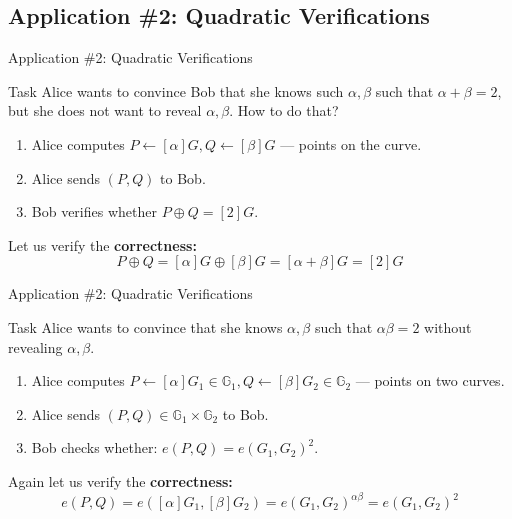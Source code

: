 \documentclass[xcolor={usenames,dvipsnames}]{beamer}
\begin{document}
    \subsection{Application \#2: Quadratic Verifications}
    \begin{frame}{Application \#2: Quadratic Verifications}
        \begin{block}{Task}
            Alice wants to convince Bob that she knows such $\alpha,\beta$ such that $\alpha + \beta = 2$, but she does not want to reveal $\alpha,\beta$. How to do that?
        \end{block}

        \pause\begin{example}
            \begin{enumerate}
                \item Alice computes $P \gets [\alpha]G, Q \gets [\beta]G$ --- points on the curve.
                \item \pause Alice sends $(P,Q)$ to Bob.
                \item \pause Bob verifies whether $P\oplus Q = [2]G$.
            \end{enumerate}
            
            \pause Let us verify the \textbf{correctness:} 
            \begin{equation*}
                P\oplus Q = [\alpha]G \oplus [\beta]G = [\alpha+\beta]G = [2]G
            \end{equation*}
        \end{example}
    \end{frame}

    \begin{frame}{Application \#2: Quadratic Verifications}
        \begin{block}{Task}
            Alice wants to convince that she knows $\alpha,\beta$ such that $\alpha\beta=2$ without revealing $\alpha,\beta$.
        \end{block}

        \pause\begin{example}
            \begin{enumerate}
                \item Alice computes $P \gets [\alpha]G_1 \in \mathbb{G}_1, Q \gets [\beta]G_2 \in \mathbb{G}_2$ --- points on two curves.
                \item \pause Alice sends $(P,Q) \in \mathbb{G}_1 \times \mathbb{G}_2$ to Bob.
                \item \pause Bob checks whether: $e(P,Q) = e(G_1,G_2)^{2}$.
            \end{enumerate}
            
            \pause Again let us verify the \textbf{correctness:} 
            \begin{equation*}
                e(P,Q) = e([\alpha]G_1,[\beta]G_2) = e(G_1,G_2)^{\alpha\beta} = e(G_1,G_2)^{2}
            \end{equation*}
        \end{example}
    \end{frame}
\end{document}
